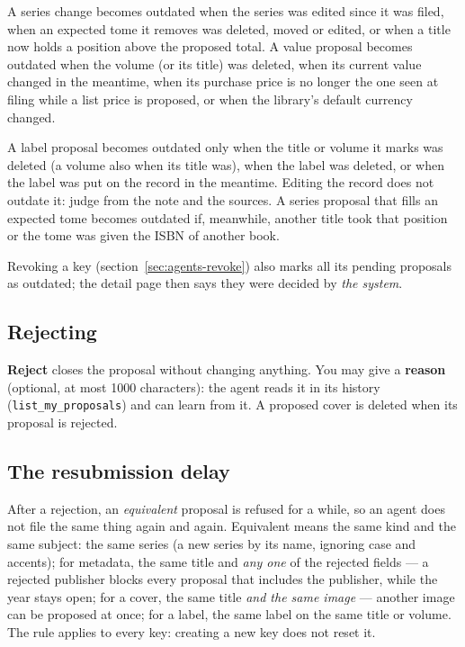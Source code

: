 A series change becomes outdated when the series was edited since it
was filed, when an expected tome it removes was deleted, moved or
edited, or when a title now holds a position above the proposed total.
A value proposal becomes outdated when the volume (or its title) was
deleted, when its current value changed in the meantime, when its
purchase price is no longer the one seen at filing while a list price
is proposed, or when the library's default currency changed.

A label proposal becomes outdated only when the title or volume it
marks was deleted (a volume also when its title was), when the label
was deleted, or when the label was put on the record in the meantime.
Editing the record does not outdate it: judge from the note and the
sources. A series proposal that fills an expected tome becomes
outdated if, meanwhile, another title took that position or the tome
was given the ISBN of another book.

Revoking a key (section~\ref{sec:agents-revoke}) also marks all its
pending proposals as outdated; the detail page then says they were
decided by \emph{the system}.

\subsection{Rejecting}

\textbf{Reject} closes the proposal without changing anything. You
may give a \textbf{reason} (optional, at most 1000 characters): the
agent reads it in its history (\texttt{list\_my\_proposals}) and can
learn from it. A proposed cover is deleted when its proposal is
rejected.

\subsection{The resubmission delay}
\label{sec:agents-delay}

After a rejection, an \emph{equivalent} proposal is refused for a
while, so an agent does not file the same thing again and again.
Equivalent means the same kind and the same subject: the same series
(a new series by its name, ignoring case and accents); for metadata,
the same title and \emph{any one} of the rejected fields --- a rejected
publisher blocks every proposal that includes the publisher, while the
year stays open; for a cover, the same title \emph{and the same image}
--- another image can be proposed at once; for a label, the same label
on the same title or volume. The rule applies to every key: creating a new key does not
reset it.

